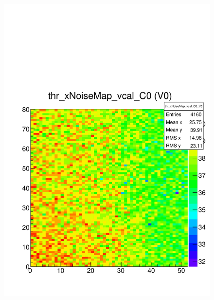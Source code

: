 \documentclass[a4paper,12pt,twoside]{article}
\begin{document}
\begin{figure} [h!]
\centering
\begin{minipage}{.48\textwidth}
  \centering
  \includegraphics[width=\textwidth]{./Figures/HRSCurves_thrMap.pdf}
  \label{HRSCurves-thrMap}
\end{minipage}%
\hspace{2mm}
\begin{minipage}{.48\textwidth}
  \centering

\end{minipage}
\end{figure}
\end{document}
